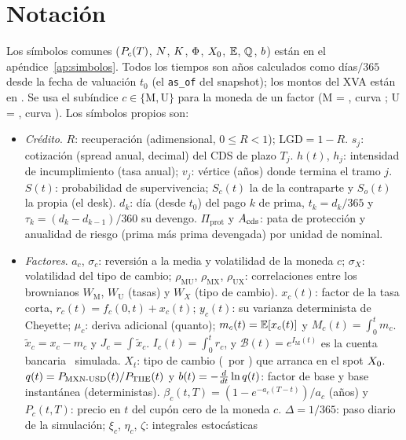 \section{Notación}\label{sec:cap14-notacion}

Los símbolos comunes ($P_{c}(T)$, $N$, $K$, $\Phi$, $X_0$, $\mathbb{E}$, $\mathbb{Q}$, $b$) están en el
apéndice~\ref{ap:simbolos}. Todos los tiempos son años calculados como días$/365$ desde la fecha de valuación
$t_0$ (el \texttt{as\_of} del snapshot); los montos del XVA están en \MXN. Se usa el subíndice $c\in\{\mathrm M,\mathrm U\}$
para la moneda de un factor (M = \MXN, curva \cTIIE; U = \USD, curva \cSOFR). Los símbolos propios son:
\begin{itemize}
  \item \emph{Crédito}. $R$: recuperación (adimensional, $0\le R<1$); $\mathrm{LGD}=1-R$. $s_j$: cotización
        (spread anual, decimal) del CDS de plazo $T_j$. $h(t)$, $h_j$: intensidad de incumplimiento (tasa anual);
        $v_j$: vértice (años) donde termina el tramo $j$. $S(t)$: probabilidad de supervivencia; $S_c(t)$ la de la
        contraparte y $S_o(t)$ la propia (el desk). $d_k$: día (desde $t_0$) del pago $k$ de prima, $t_k=d_k/365$
        y $\tau_k=(d_k-d_{k-1})/360$ su devengo. $\Pi_{\mathrm{prot}}$ y $A_{\mathrm{cds}}$: pata de protección
        y anualidad de riesgo (prima más prima devengada) por unidad de nominal.
  \item \emph{Factores}. $a_c$, $\sigma_c$: reversión a la media y volatilidad de la moneda $c$;
        $\sigma_X$: volatilidad del tipo de cambio; $\rho_{\mathrm{MU}}$, $\rho_{\mathrm{MX}}$, $\rho_{\mathrm{UX}}$:
        correlaciones entre los brownianos $W_{\mathrm M}$, $W_{\mathrm U}$ (tasas) y $W_X$ (tipo de cambio).
        $x_c(t)$: factor de la tasa corta, $r_c(t)=f_c(0,t)+x_c(t)$; $y_c(t)$: su varianza determinista de
        Cheyette; $\mu_c$: deriva adicional (quanto); $m_c(t)=\mathbb{E}[x_c(t)]$ y $M_c(t)=\int_0^t m_c$.
        $\tilde x_c=x_c-m_c$ y $J_c=\int\tilde x_c$. $I_c(t)=\int_0^t r_c$, y
        $\mathcal B(t)=e^{I_{\mathrm M}(t)}$ es la cuenta bancaria \MXN\ simulada. $X_t$: tipo de cambio
        (\MXN\ por \USD) que arranca en el spot $X_0$. $q(t)=P_{\mathrm{MXN\text{-}USD}}(t)/P_{\mathrm{TIIE}}(t)$ y
        $b(t)=-\tfrac{d}{dt}\ln q(t)$: factor de base y base instantánea (deterministas).
        $\beta_c(t,T)=(1-e^{-a_c(T-t)})/a_c$ (años) y $P_c(t,T)$: precio en $t$ del cupón cero de la moneda $c$.
        $\Delta=1/365$: paso diario de la simulación; $\xi_c$, $\eta_c$, $\zeta$: integrales estocásticas

\end{itemize}
